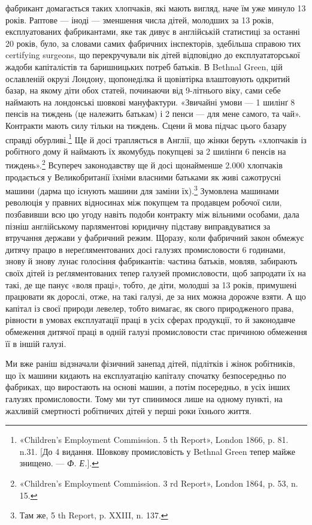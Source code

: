 \parcont{}  %
фабрикант домагається таких хлопчаків, які мають вигляд, наче
їм уже минуло 13 років. Раптове — іноді — зменшення числа
дітей, молодших за 13 років, експлуатованих фабрикантами, яке
так дивує в англійській статистиці за останні 20 років, було, за
словами самих фабричних інспекторів, здебільша справою тих
certifying surgeons, що перекручували вік дітей відповідно до
експлуататорської жадоби капіталістів та баришницьких потреб
батьків. В Bethnal Green, цій ославленій окрузі Лондону, щопонеділка
й щовівтірка влаштовують одкритий базар, на якому
діти обох статей, починаючи від 9-літнього віку, сами себе наймають
на лондонські шовкові мануфактури. «Звичайні умови —
1 шилінґ 8 пенсів на тиждень (це належить батькам) і 2 пенси —
для мене самого, та чай». Контракти мають силу тільки на тиждень.
Сцени й мова підчас цього базару справді обурливі.\footnote{
«Children’s Employment Commission. 5 th Report», London 1866,
p. 81. n.31. [До 4 видання. Шовкову промисловість у Bethnal Green тепер
майже знищено. — \emph{Ф. Е.}].
} Ще й досі
трапляється в Англії, що жінки беруть «хлопчаків із робітного
дому й наймають їх якомубудь покупцеві за 2 шилінґи
6 пенсів на тиждень».\footnote{
«Children’s Employment Commission. 3 rd Report», London 1864,
p. 53, n. 15.
} Всупереч законодавству ще й досі щонайменше
\num{2.000} хлопчаків продається у Великобританії їхніми
власними батьками як живі сажотрусні машини (дарма що існують
машини для заміни їх).\footnote{
Там же, 5 th Report, p. XXIII, n. 137.
} Зумовлена машинами революція у
правних відносинах між покупцем та продавцем робочої сили,
позбавивши всю цю угоду навіть подоби контракту між вільними
особами, дала пізніш англійському парляментові юридичну
підставу виправдуватися за втручання держави у фабричний
режим. Щоразу, коли фабричний закон обмежує дитячу працю
в нереґляментованих досі галузях промисловости 6 годинами,
знову й знову лунає голосіння фабрикантів: частина батьків,
мовляв, забирають своїх дітей із реґляментованих тепер галузей
промисловости, щоб запродати їх на такі, де ще панує «воля
праці», тобто, де діти, молодші за 13 років, примушені працювати
як дорослі, отже, на такі галузі, де за них можна дорожче
взяти. А що капітал із своєї природи левелер, тобто вимагає,
як свого природженого права, рівности в умовах експлуатації
праці в усіх сферах продукції, то й законодавче обмеження дитячої
праці в одній галузі промисловости стає причиною обмеження
її в іншій галузі.

Ми вже раніш відзначали фізичний занепад дітей, підлітків
і жінок робітників, що їх машини кидають на експлуатацію капіталу
спочатку безпосередньо по фабриках, що виростають на
основі машин, а потім посередньо, в усіх інших галузях промисловости.
Тому ми тут спинимося лише на одному пункті, на жахливій
смертності робітничих дітей у перші роки їхнього життя.
\parbreak{}  %
